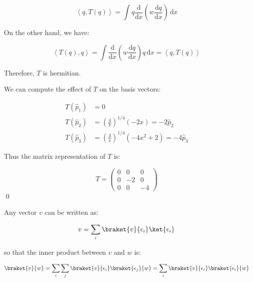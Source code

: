 \documentclass[12pt]{article}
\begin{document}
\begin{equation}
    \left\langle q, T(q) \right\rangle = \int q \frac{\mathrm{d}}{\mathrm{d}x} \left( w \frac{\mathrm{d}q}{\mathrm{d}x} \right) \, \mathrm{d}x
\end{equation}

On the other hand, we have:

\begin{equation}
    \left\langle T(q), q \right\rangle = \int \frac{\mathrm{d}}{\mathrm{d}x} \left( w \frac{\mathrm{d}q}{\mathrm{d}x} \right) q \, \mathrm{d}x = \left\langle q, T(q) \right\rangle
\end{equation}

Therefore, $T$ is hermitian.

We can compute the effect of $T$ on the basis vectors:

\begin{equation}
\begin{split}
    T(\hat{p}_{1}) &= 0 \\
    T(\hat{p}_{2}) &= \left( \frac{4}{\pi} \right)^{1/4} (-2x) = -2 \hat{p}_{2} \\
    T(\hat{p}_{3}) &= \left( \frac{4}{\pi} \right)^{1/4} (-4x^{2} + 2) = -4 \hat{p}_{3}
\end{split}
\end{equation}

Thus the matrix representation of $T$ is:

\begin{equation}
    T =
    \begin{pmatrix}
        0 & 0 & 0 \\
        0 & -2 & 0 \\
        0 & 0 & -4
    \end{pmatrix}
\end{equation}
\qed



Any vector $v$ can be written as:

\begin{equation}
    v = \sum_{i} \braket{v}{\epsilon_{i}} \ket{\epsilon_{i}}
\end{equation}

so that the inner product between $v$ and $w$ is:

\begin{equation}
    \braket{v}{w} = \sum_{i} \sum_{j} \braket{v}{\epsilon_{i}} \braket{\epsilon_{j}}{w} = \sum_{i} \braket{v}{\epsilon_{i}} \braket{\epsilon_{i}}{w}
\end{equation}
\end{document}
